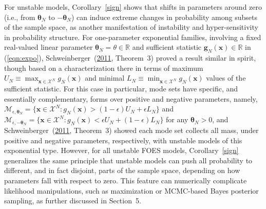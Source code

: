 \documentclass[12pt]{article}
\theoremstyle{definition}
\begin{document}
 For unstable models, Corollary~\ref{sign} shows that shifts in parameters around zero (i.e., from $\boldsymbol \theta_N$ to $-\boldsymbol \theta_N$) can induce extreme changes in probability among subsets of the sample space, as another manifestation  of instability
 and hyper-sensitivity in probability structure.    For one-parameter exponential families, involving a fixed real-valued linear parameter  $\boldsymbol \theta_N = \theta \in \mathbb{R}$ and sufficient statistic $\boldsymbol g_N(\boldsymbol x)\in \mathbb{R}$ in (\ref{eqn:expo}),  Schweinberger~(\protect\hyperlink{ref-schweinberger2011instability}{2011}, Theorem~3) proved a result similar in spirit, though based on a characterization there in terms of maximum $U_N \equiv \max_{\boldsymbol x\in\mathcal{X}^N}g_N(\boldsymbol x)$  and minimal $L_N \equiv \min_{\boldsymbol x\in\mathcal{X}^N}g_N(\boldsymbol x)$ values of the sufficient statistic.  For this case in particular,  mode sets have specific, and essentially complementary, forms  over positive and negative parameters, namely, $\mathcal{M}_{\epsilon, \boldsymbol \theta_N} = \{\boldsymbol x \in\mathcal{X}^N: g_N(\boldsymbol x)  >  (1-\epsilon) U_N + \epsilon L_N \}$ and $\mathcal{M}_{\epsilon, -\boldsymbol \theta_N} = \{\boldsymbol x \in\mathcal{X}^N: g_N(\boldsymbol x)  <  \epsilon U_N + (1-\epsilon) L_N \}$ for any $\boldsymbol \theta_N>0$, and
 Schweinberger~(\protect\hyperlink{ref-schweinberger2011instability}{2011}, Theorem~3)  showed each mode set collects all mass, under positive and negative parameters, respectively, with unstable models of this exponential type.  However, for all unstable FOES models, Corollary~\ref{sign} generalizes the same principle
 that unstable models can push all probability to different, and in fact disjoint, parts of the sample space, depending on how parameters fall with respect to zero.  This feature can numerically complicate likelihood manipulations, such as maximization or MCMC-based Bayes posterior sampling, as further discussed in Section~5.\\
\end{document}
